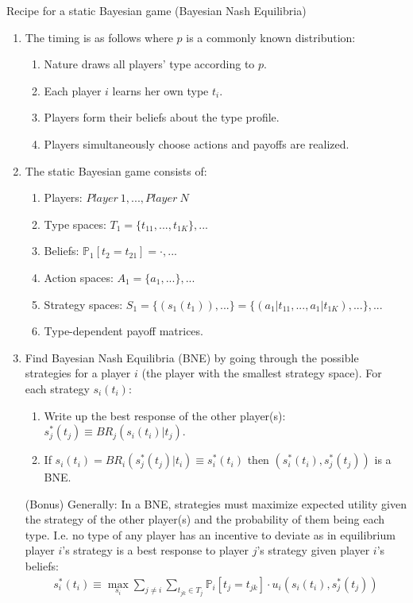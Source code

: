 \begin{frame}{Recipe for a static Bayesian game (Bayesian Nash Equilibria)}
    \begin{enumerate}
      \item The timing is as follows where $p$ is a commonly known distribution:
      \begin{enumerate}\normalsize
        \item Nature draws all players' type according to $p$.
        \item Each player $i$ learns her own type $t_{i}$.
        \item Players form their beliefs about the type profile.
        \item Players simultaneously choose actions and payoffs are realized.
      \end{enumerate}
      \item The static Bayesian game consists of:
      \begin{enumerate}\normalsize
        \item Players: $Player\ 1,...,Player\ N$
        \item Type spaces: $T_1=\{t_{11},...,t_{1K}\},...$
        \item Beliefs: $\mathbb{P}_1[t_2=t_{21}]=\cdot,...$
        \item Action spaces: $A_1=\{a_1,...\},...$
        \item Strategy spaces: $S_1=\{(s_1(t_1)),...\}=\{(a_1|t_{11},...,a_1|t_{1K}),...\},...$
        \item Type-dependent payoff matrices.
      \end{enumerate}
      \item Find Bayesian Nash Equilibria (BNE) by going through the possible strategies for a player $i$ (the player with the smallest strategy space). For each strategy $s_i(t_i)$:
      \begin{enumerate}\normalsize
        \item Write up the best response of the other player(s): $s_j^*(t_j)\equiv BR_j\left(s_i(t_i)|t_j\right)$.
        \item If $s_i(t_i)=BR_i\left(s_j^*(t_j)|t_i\right)\equiv s_i^*(t_i)$ then $\left(s_i^*(t_i),s_j^*(t_j)\right)$ is a BNE.
      \end{enumerate}
      \item[(Bonus)] Generally: In a BNE, strategies must maximize expected utility given the strategy of the other player(s) and the probability of them being each type. I.e. no type of any player has an incentive to deviate as in equilibrium player $i$'s strategy is a best response to player $j$'s strategy given player $i$'s beliefs:
      \begin{align*}
        s_i^*(t_i)\equiv\max\limits_{s_i}\sum\limits_{j\neq i}\sum\limits_{t_{jk}\in T_j}\mathbb{P}_i[t_j=t_{jk}]\cdot u_i\left(s_i(t_i),s_j^*(t_j)\right)
      \end{align*}
    \end{enumerate}
    \vfill\null
\end{frame}
